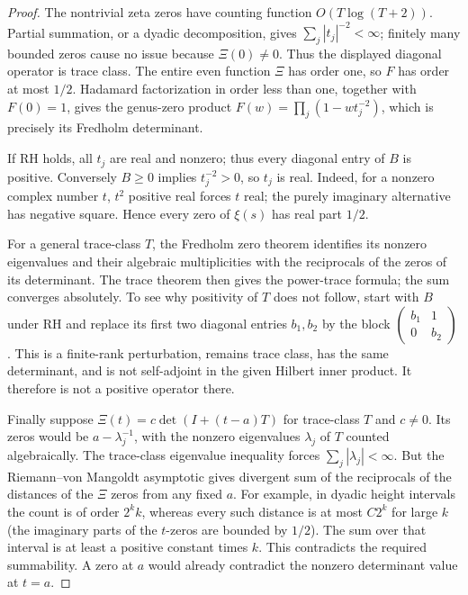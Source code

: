 \documentclass[11pt,a4paper]{article}
\theoremstyle{definition}\newtheorem{definition}[theorem]{Definition}
\theoremstyle{remark}\newtheorem{remark}[theorem]{Remark}
\begin{document}
\begin{proof}
The nontrivial zeta zeros have counting function $O(T\log(T+2))$.
Partial summation, or a dyadic decomposition, gives
$\sum_j|t_j|^{-2}<\infty$; finitely many bounded zeros cause no issue
because $\Xi(0)\ne0$.  Thus the displayed diagonal operator is trace
class.  The entire even function $\Xi$ has order one, so $F$ has
order at most $1/2$.  Hadamard factorization in order less than one,
together with $F(0)=1$, gives the genus-zero product
$F(w)=\prod_j(1-wt_j^{-2})$, which is precisely its Fredholm determinant.

If RH holds, all $t_j$ are real and nonzero; thus every diagonal
entry of $B$ is positive.  Conversely $B\geq0$ implies
$t_j^{-2}>0$, so $t_j$ is real.  Indeed, for a nonzero complex number
$t$, $t^2$ positive real forces $t$ real; the purely imaginary
alternative has negative square.  Hence every zero of $\xi(s)$
has real part $1/2$.

For a general trace-class $T$, the Fredholm zero theorem identifies
its nonzero eigenvalues and their algebraic multiplicities with the
reciprocals of the zeros of its determinant.  The trace theorem then
gives the power-trace formula; the sum converges absolutely.  To see
why positivity of $T$ does not follow, start with $B$ under RH and
replace its first two diagonal entries $b_1,b_2$ by the block
$\left(\begin{smallmatrix}b_1&1\\0&b_2\end{smallmatrix}\right)$.
This is a finite-rank perturbation, remains trace class, has the
same determinant, and is not self-adjoint in the given Hilbert
inner product.  It therefore is not a positive operator there.

Finally suppose $\Xi(t)=c\det(I+(t-a)T)$ for trace-class $T$ and
$c\ne0$.  Its zeros would be $a-\lambda_j^{-1}$, with the nonzero
eigenvalues $\lambda_j$ of $T$ counted algebraically.  The trace-class
eigenvalue inequality forces $\sum_j|\lambda_j|<\infty$.
But the Riemann--von Mangoldt asymptotic gives divergent sum of the
reciprocals of the distances of the $\Xi$ zeros from any fixed $a$.
For example, in dyadic height intervals the count is of order
$2^k k$, whereas every such distance is at most $C2^k$ for large
$k$ (the imaginary parts of the $t$-zeros are bounded by $1/2$).
The sum over that interval is at least a positive constant times
$k$.  This contradicts the required summability.  A zero at $a$
would already contradict the nonzero determinant value at $t=a$.
\end{proof}
\end{document}

